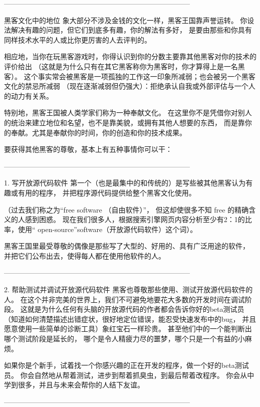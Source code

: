 \documentclass[a4paper,12pt,UTF8,twoside]{ctexbook}
\begin{document}
--------------------------------------------------------------------------------

黑客文化中的地位
象大部分不涉及金钱的文化一样，黑客王国靠声誉运转。 你设法解决有趣的问题，但它们到底多有趣，你的解法有多好， 是要由那些和你具有同样技术水平的人或比你更厉害的人去评判的。

相应地，当你在玩黑客游戏时，你得认识到你的分数主要靠其他黑客对你的技术的评价给出 （这就是为什么只有在其它黑客称你为黑客时，你才算得上是一名黑客）。 这个事实常会被黑客是一项孤独的工作这一印象所减弱；也会被另一个黑客文化的禁忌所减弱 （现在逐渐减弱但仍强大）：拒绝承认自我或外部评估与一个人的动力有关系。

特别地，黑客王国被人类学家们称为一种奉献文化。 在这里你不是凭借你对别人的统治来建立地位和名望，也不是靠美貌，或拥有其他人想要的东西， 而是靠你的奉献。尤其是奉献你的时间，你的创造和你的技术成果。

要获得其他黑客的尊敬，基本上有五种事情你可以干：


--------------------------------------------------------------------------------

1. 写开放源代码软件
第一个（也是最集中的和传统的）是写些被其他黑客认为有趣或有用的程序， 并把程序源代码提供给整个黑客文化使用。

（过去我们称之为“free software （自由软件）”， 但这却使很多不知 free 的精确含义的人感到困惑。 现在我们很多人，根据搜索引擎网页内容分析至少有2：1的比率，使用“ open-source”software（开放源代码软件）这个词）。

黑客王国里最受尊敬的偶像是那些写了大型的、好用的、具有广泛用途的软件， 并把它们公布出去，使得每人都在使用他软件的人。


--------------------------------------------------------------------------------

2. 帮助测试并调试开放源代码软件
黑客也尊敬那些使用、测试开放源代码软件的人。 在这个并非完美的世界上，我们不可避免地要花大多数的开发时间在调试阶段。 这就是为什么任何有头脑的开放源代码的作者都会告诉你好的beta测试员 （知道如何清楚描述出错症状，很好地定位错误，能忍受快速发布中的bug， 并且愿意使用一些简单的诊断工具）象红宝石一样珍贵。 甚至他们中的一个能判断出哪个测试阶段是延长的， 哪个是令人精疲力尽的噩梦，哪个只是一个有益的小麻烦。

如果你是个新手，试着找一个你感兴趣的正在开发的程序，做一个好的beta测试员。 你会自然地从帮着测试，进步到帮着抓臭虫，到最后帮着改程序。 你会从中学到很多，并且与未来会帮你的人结下友谊。


--------------------------------------------------------------------------------
\end{document}
